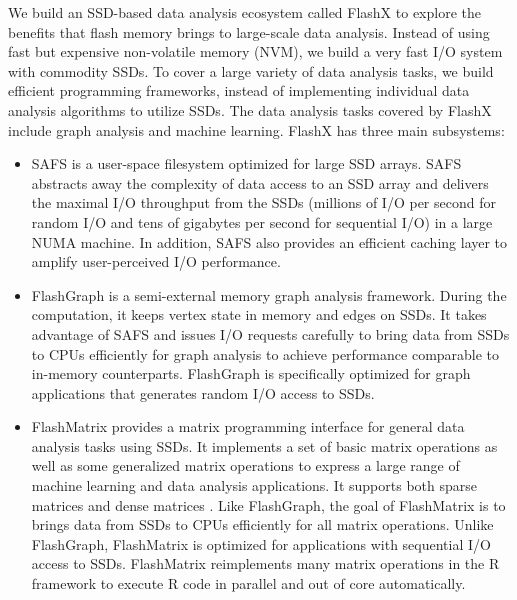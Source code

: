 We build an SSD-based data analysis ecosystem called FlashX to explore
the benefits that flash memory brings to large-scale data analysis. Instead
of using fast but expensive non-volatile memory (NVM), we build a very fast
I/O system with commodity SSDs. To cover a large variety of data analysis tasks,
we build efficient programming frameworks, instead of implementing individual
data analysis algorithms to utilize SSDs. The data analysis tasks covered
by FlashX include graph analysis and machine learning. FlashX has three main
subsystems:
\begin{itemize}
	\item SAFS \cite{safs} is a user-space filesystem optimized for large SSD
		arrays. SAFS abstracts away the complexity of data access to an SSD array
		and delivers the maximal I/O throughput from the SSDs (millions of I/O
		per second for random I/O and tens of gigabytes per second for sequential
		I/O) in a large NUMA
		machine. In addition, SAFS also provides an efficient caching layer
		\cite{hotstorage12} to amplify user-perceived I/O performance.
	\item FlashGraph \cite{flashgraph} is a semi-external memory graph analysis
		framework. During the computation, it keeps vertex state in memory and
		edges on SSDs. It takes advantage of SAFS and issues I/O requests
		carefully to bring data from SSDs to CPUs efficiently for graph analysis
		to achieve performance comparable to in-memory counterparts. FlashGraph
		is specifically optimized for graph applications that generates random
		I/O access to SSDs.
	\item FlashMatrix provides a matrix programming interface for general data
		analysis tasks using SSDs. It implements a set of basic matrix operations
		as well as some generalized matrix operations to express a large range
		of machine learning and data analysis applications. It supports
		both sparse matrices \cite{SEM_SpMM} and dense matrices \cite{flashmatrix}.
		Like FlashGraph, the goal of FlashMatrix is to brings data from SSDs to
		CPUs efficiently for all matrix operations. Unlike
		FlashGraph, FlashMatrix is optimized for applications with sequential
		I/O access to SSDs. FlashMatrix reimplements many matrix operations
		in the R framework to execute R code in parallel and out of core
		automatically.
\end{itemize}

